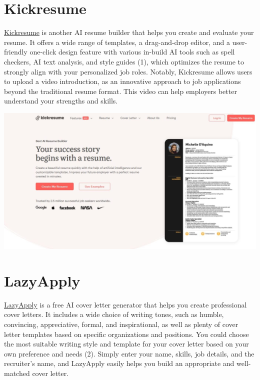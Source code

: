 \documentclass[
]{book}
\begin{document}
\hypertarget{kickresume}{%
\section{Kickresume}\label{kickresume}}

\href{https://www.kickresume.com/en/}{Kickresume} is another AI resume builder that helps you create and evaluate your resume. It offers a wide range of templates, a drag-and-drop editor, and a user-friendly one-click design feature with various in-build AI tools such as spell checkers, AI text analysis, and style guides (1), which optimizes the resume to strongly align with your personalized job roles. Notably, Kickresume allows users to upload a video introduction, as an innovative approach to job applications beyond the traditional resume format. This video can help employers better understand your strengths and skills.~

\includegraphics[width=5.46875in,height=\textheight]{Kickresume pic.png}

\hypertarget{lazyapply}{%
\section{LazyApply}\label{lazyapply}}

\href{https://lazyapply.com/cover-letter-generator}{LazyApply} is a free AI cover letter generator that helps you create professional cover letters. It includes a wide choice of writing tones, such as humble, convincing, appreciative, formal, and inspirational, as well as plenty of cover letter templates based on specific organizations and positions. You could choose the most suitable writing style and template for your cover letter based on your own preference and needs (2). Simply enter your name, skills, job details, and the recruiter's name, and LazyApply easily helps you build an appropriate and well-matched cover letter.~
\end{document}
